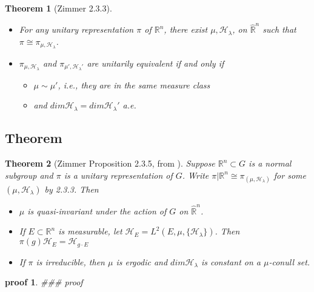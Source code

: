 \documentclass[
]{article}
\newtheorem{thm}{Theorem}
\newtheorem{pf}{proof}
\begin{document}
\begin{thm}[Zimmer 2.3.3]
  \begin{itemize}
    \item For any unitary representation \(\pi\) of
      \(\mathbb{R}^n\), there exist \(\mu, \mathscr{H}_{\lambda}\), on
      \(\hat{\mathbb{R}}^n\) such that \(\pi \cong \pi_{\mu, \mathscr{H}_{\lambda}}\).
    \item \(\pi_{\mu, \mathscr{H}_{\lambda}}\) and
      \(\pi_{\mu', \mathscr{H}_{\lambda}'}\) are unitarily equivalent if and only if 
      \begin{itemize}
        \item \(\mu \sim \mu'\), i.e., they are in the same measure class
        \item and \(dim\mathscr{H}_{\lambda} = dim \mathscr{H}_{\lambda}'\) a.e.
      \end{itemize}
  \end{itemize}
\end{thm}

\hypertarget{theorem-1}{%
\subsection{Theorem}\label{theorem-1}}

\begin{thm}[Zimmer Proposition 2.3.5, from \cite{mackey76}]
   
Suppose \(\mathbb{R}^n \subset G\) is a normal subgroup and \(\pi\) is a unitary representation of \(G\).
Write \(\pi | \mathbb{R}^n \cong \pi_{(\mu, \mathscr{H}_{\lambda})}\) for some
\((\mu, \mathscr{H}_{\lambda})\) by 2.3.3. Then  
  \begin{itemize}
    \item \(\mu\) is quasi-invariant under the action of \(G\) on \(\hat{\mathbb{R}}^n\). 
    \item If \(E \subset \mathbb{R}^n\) is measurable, let
      \(\mathscr{H}_E = L^2(E, \mu, \{\mathscr{H}_{\lambda}\})\).
      Then \(\pi(g)\mathscr{H}_E = \mathscr{H}_{g \cdot E}\)
    \item If \(\pi\) is irreducible, then \(\mu\) is ergodic and \(dim\mathscr{H}_{\lambda}\) is
      constant on a \(\mu\)-conull set.
  \end{itemize}
\end{thm}

\begin{pf}
   \#\#\# proof 
\end{pf}
\end{document}
